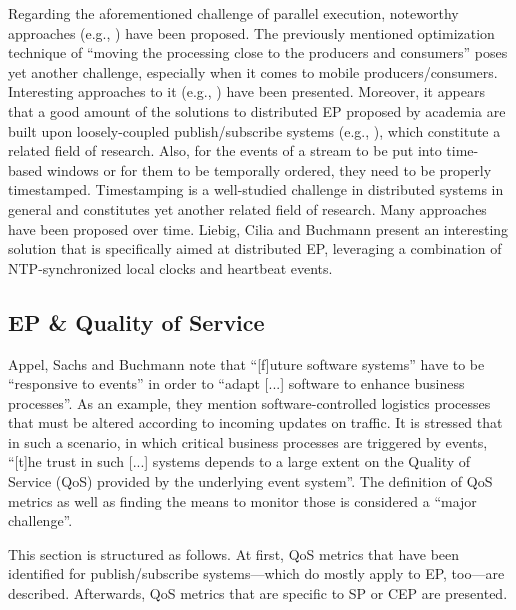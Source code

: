 \documentclass[article, 10pt, type=bsc, colorback, accentcolor=tud8b, parskip=half, bibliography=totocnumbered]{tudthesis}
\begin{document}
Regarding the aforementioned challenge of parallel execution, noteworthy approaches (e.g., \cite{stratified, Farroukh:2009:PEP:1619258.1619269, Khandekar:2009:COS:1656980.1657002, Hirzel:2012:PCP:2335484.2335506}) have been proposed.
The previously mentioned optimization technique of ``moving the processing close to the producers and consumers'' poses yet another challenge, especially when it comes to mobile producers/consumers.
Interesting approaches to it (e.g., \cite{Pietzuch:2003:FEC:1515915.1515921, 1203579, Ottenwalder:2013:MOM:2488222.2488265}) have been presented.
Moreover, it appears that a good amount of the solutions to distributed EP proposed by academia are built upon loosely-coupled publish/subscribe systems (e.g., \cite{792159, Pietzuch:2003:FEC:1515915.1515921, 1203579, Farroukh:2009:PEP:1619258.1619269}), which constitute a related field of research.
Also, for the events of a stream to be put into time-based windows or for them to be temporally ordered, they need to be properly timestamped.
Timestamping is a well-studied challenge in distributed systems in general and constitutes yet another related field of research.
Many approaches have been proposed over time.
Liebig, Cilia and Buchmann \cite{792159} present an interesting solution that is specifically aimed at distributed EP, leveraging a combination of NTP-synchronized local clocks and heartbeat events.

\subsection{EP \& Quality of Service}
\label{sec:ep_qos}

Appel, Sachs and Buchmann \cite{quality} note that ``[f]uture software systems'' have to be ``responsive to events'' in order to ``adapt [...] software to enhance business processes''.
As an example, they mention software-controlled logistics processes that must be altered according to incoming updates on traffic.
It is stressed that in such a scenario, in which critical business processes are triggered by events, ``[t]he trust in such [...] systems depends to a large extent on the Quality of Service (QoS) provided by the underlying event system''.
The definition of QoS metrics as well as finding the means to monitor those is considered a ``major challenge''.

This section is structured as follows.
At first, QoS metrics that have been identified for publish/subscribe systems---which do mostly apply to EP, too---are described.
Afterwards, QoS metrics that are specific to SP or CEP are presented.
\end{document}
